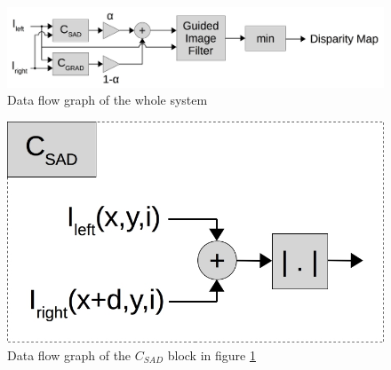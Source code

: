 \newpage
\begin{figure}[ht!]
  \centering
  \includegraphics[scale=0.3]{figures/whole_system}
  \caption{Data flow graph of the whole system}
  \label{fig:whole_system}
\end{figure}

\begin{figure}[ht!]
  \centering
  \includegraphics[scale=0.3]{figures/c_sad}
  \caption{Data flow graph of the $C_{SAD}$ block in figure \ref{fig:whole_system}}
  \label{fig:c_sad}
\end{figure}

